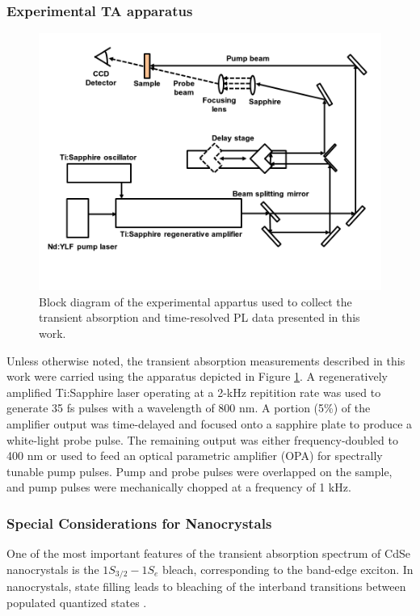 \subsubsection{Experimental TA apparatus}

\begin{figure}
\begin{center}
\includegraphics[width=\textwidth]{./Chapter2/ta_setup.png}
\caption[Block diagram of transient absorption apparatus.]{Block diagram of the experimental appartus used to collect the transient absorption and time-resolved PL data presented in this work.}
\label{f:tasetup}
\end{center}
\end{figure}

Unless otherwise noted, the transient absorption measurements described in this work were carried using the apparatus depicted in Figure \ref{f:tasetup}. A regeneratively amplified Ti:Sapphire laser operating at a 2-kHz repitition rate was used to generate 35 fs pulses with a wavelength of 800 nm. A portion (5\%) of the amplifier output was time-delayed and focused onto a sapphire plate to produce a white-light probe pulse. The remaining output was either frequency-doubled to 400 nm or used to feed an optical parametric amplifier (OPA) for spectrally tunable pump pulses. Pump and probe pulses were overlapped on the sample, and pump pulses were mechanically chopped at a frequency of 1 kHz.

\subsubsection{Special Considerations for Nanocrystals}
One of the most important features of the transient absorption spectrum of CdSe nanocrystals is the $1S_{3/2}-1S_e$ bleach, corresponding to the band-edge exciton. In nanocrystals, state filling leads to bleaching of the interband transitions between populated quantized states \cite{doi:10.1021/jp9944132}. \par

